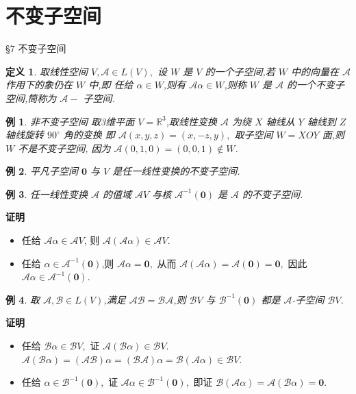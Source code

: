 \documentclass[13pt]{beamer}
\newtheorem{exa}{例}
\newtheorem*{defi}{定义}
\def\pf{{\bf 证明~~ }}
\def\A{\mathscr{A}}
\def\B{\mathscr{B}}
\def\0{\mathbf{0}}
\begin{document}
\section{不变子空间}
\begin{frame}{\S 7 不变子空间}
\begin{defi}
取线性空间 $V, \A  \in L(V),$ 设 $W$ 是 $V$ 的一个子空间,若 $W$ 中的向量在 $\A $ 作用下的象仍在 $W$ 中,即
任给 $\alpha \in W$,则有 $\A  \alpha \in W$,则称 $W$ 是 $\A $ 的一个不变子空间,筒称为 $\A -$ 子空间.
\end{defi}


\begin{exa}{非不变子空间}
取3维平面 $V=\mathbb{R}^{3}$,取线性变换 $\A $ 为绕 $X$ 轴线从 $Y$ 轴线到 $Z$ 轴线旋转 $90^{\circ}$ 角的变换
即 $\A (x, y, z)=(x,-z, y),$ 取子空间 $W=X O Y$ 面,则 $W$ 不是不变子空间, 因为 $\A (0,1,0)=(0,0,1) \notin W$.
\end{exa}

\begin{exa}
	平凡子空间 $\0$ 与 $V$ 是任一线性变换的不变子空间.
\end{exa}

\end{frame}

\begin{frame}


\begin{exa}
任一线性变换 $\A $ 的值域 $\A  V$ 与核 $\A ^{-1}(\0)$ 是 $\A $ 的不变子空间.
\end{exa}
\pf
\begin{itemize}
\item 任给 $\A  \alpha \in \A  V$, 则 $\A (\A  \alpha) \in \A  V$.
\item 任给 $\alpha \in \A ^{-1}(\0) $,则 $\A  \alpha=\0,$ 从而 $\A (\A  \alpha)=\A (\0)=\0,$ 因此 $\A  \alpha \in \A ^{-1}(\0).$
\end{itemize}




\begin{exa}
取 $\A , \B \in L(V)$,满足 $\A  \B =\B \A $,则 $\B V$ 与 $\B^{-1}(\0)$ 都是 $\A$-子空间
$\B V$.
\end{exa}
\pf
\begin{itemize}
\item 任给 $\B \alpha \in \B V,$ 证 $\A (\B \alpha) \in \B V$.
$\A (\B \alpha)=(\A  \B) \alpha=(\B \A ) \alpha= \B (\A  \alpha) \in \B V$.
\item 任给 $\alpha \in \B^{-1}(\0),$ 证 $\A  \alpha \in \B ^{-1}(\0),$ 
即证 $\B(\A  \alpha)=\A (\B \alpha)=\0.$
\end{itemize}


\end{frame}
\end{document}
